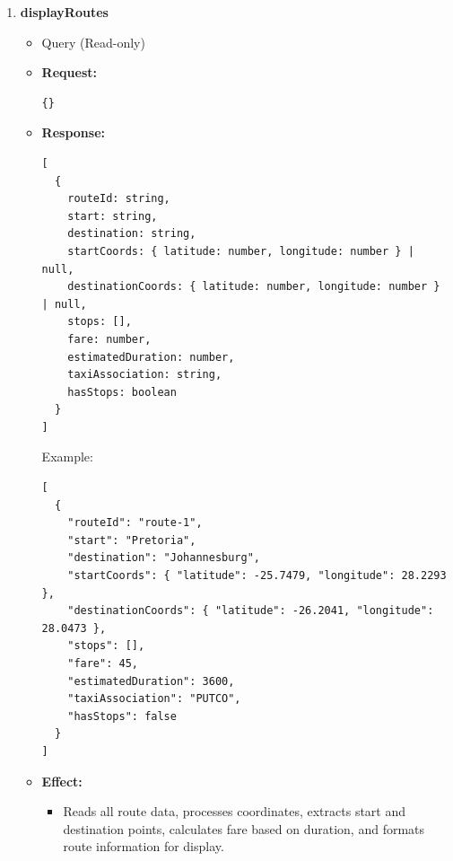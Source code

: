 \documentclass[a4paper,12pt]{article}
\begin{document}
\begin{enumerate}
  \item \textbf{displayRoutes}
    \begin{itemize}
      \item Query (Read-only)
      \item \textbf{Request:}
      \begin{verbatim}
{}
      \end{verbatim}
      \item \textbf{Response:}
      \begin{verbatim}
[
  {
    routeId: string,
    start: string,
    destination: string,
    startCoords: { latitude: number, longitude: number } | null,
    destinationCoords: { latitude: number, longitude: number } | null,
    stops: [],
    fare: number,
    estimatedDuration: number,
    taxiAssociation: string,
    hasStops: boolean
  }
]
      \end{verbatim}
      Example:
      \begin{verbatim}
[
  {
    "routeId": "route-1",
    "start": "Pretoria",
    "destination": "Johannesburg",
    "startCoords": { "latitude": -25.7479, "longitude": 28.2293 },
    "destinationCoords": { "latitude": -26.2041, "longitude": 28.0473 },
    "stops": [],
    "fare": 45,
    "estimatedDuration": 3600,
    "taxiAssociation": "PUTCO",
    "hasStops": false
  }
]
      \end{verbatim}
      \item \textbf{Effect:}
      \begin{itemize}
        \item Reads all route data, processes coordinates, extracts start and destination points, calculates fare based on duration, and formats route information for display.
      \end{itemize}
    \end{itemize}


\end{enumerate}
\end{document}
